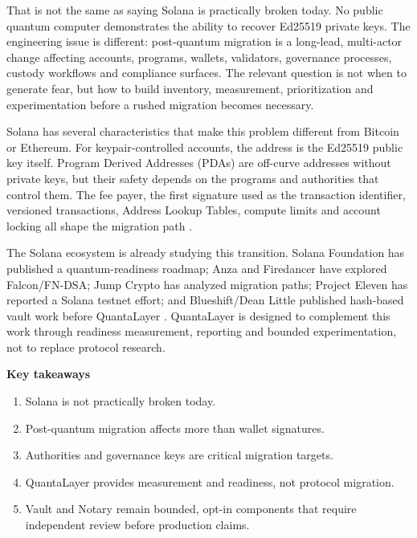 \documentclass[11pt,a4paper,oneside,parskip=false]{scrartcl}
\begin{document}
That is not the same as saying Solana is practically broken today. No public quantum computer demonstrates the ability to recover Ed25519 private keys. The engineering issue is different: post-quantum migration is a long-lead, multi-actor change affecting accounts, programs, wallets, validators, governance processes, custody workflows and compliance surfaces. The relevant question is not when to generate fear, but how to build inventory, measurement, prioritization and experimentation before a rushed migration becomes necessary.

Solana has several characteristics that make this problem different from Bitcoin or Ethereum. For keypair-controlled accounts, the address is the Ed25519 public key itself. Program Derived Addresses (PDAs) are off-curve addresses without private keys, but their safety depends on the programs and authorities that control them. The fee payer, the first signature used as the transaction identifier, versioned transactions, Address Lookup Tables, compute limits and account locking all shape the migration path \cite{solana-docs-accounts,solana-docs-pda,solana-docs-transactions,solana-docs-fees,solana-docs-versioned-transactions,solana-docs-alt}.

The Solana ecosystem is already studying this transition. Solana Foundation has published a quantum-readiness roadmap; Anza and Firedancer have explored Falcon/FN-DSA; Jump Crypto has analyzed migration paths; Project Eleven has reported a Solana testnet effort; and Blueshift/Dean Little published hash-based vault work before QuantaLayer \cite{solana-quantum-readiness,anza-quantum-adversary,jump-quantum-migration-paths,projecteleven-solana-advance,blueshift-winternitz-vault-github}. QuantaLayer is designed to complement this work through readiness measurement, reporting and bounded experimentation, not to replace protocol research.

\begin{takeawaybox}
\sffamily\small
\textbf{Key takeaways}
\begin{enumerate}[leftmargin=*,itemsep=1pt,topsep=3pt]
\item Solana is not practically broken today.
\item Post-quantum migration affects more than wallet signatures.
\item Authorities and governance keys are critical migration targets.
\item QuantaLayer provides measurement and readiness, not protocol migration.
\item Vault and Notary remain bounded, opt-in components that require independent review before production claims.
\end{enumerate}
\end{takeawaybox}
\end{document}
